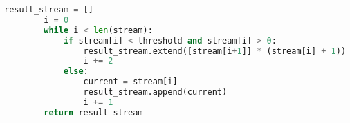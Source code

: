 \begin{lstlisting}[language=python, caption=K-RLE реализация на языке Python, captionpos=b, frame=single]
        result_stream = []
        i = 0
        while i < len(stream):
            if stream[i] < threshold and stream[i] > 0:
                result_stream.extend([stream[i+1]] * (stream[i] + 1))
                i += 2
            else:
                current = stream[i]
                result_stream.append(current)
                i += 1
        return result_stream
    
\end{lstlisting}

\endinput